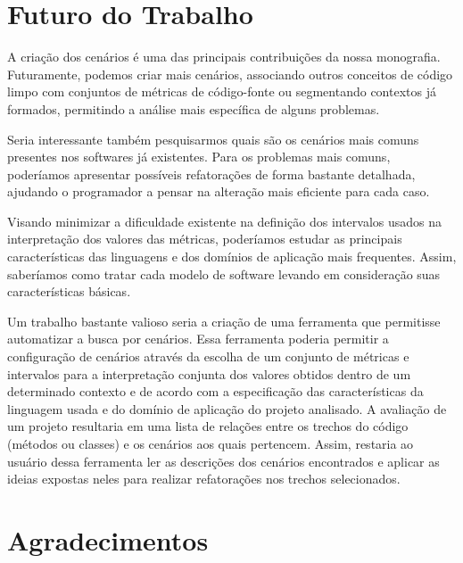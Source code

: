 \documentclass[a4paper, 11pt]{article}
\begin{document}
\section{Futuro do Trabalho}   
                                 
A criação dos cenários é uma das principais contribuições da nossa monografia. Futuramente, podemos criar mais cenários, associando outros conceitos de código limpo com conjuntos de métricas de código-fonte ou segmentando contextos já formados, permitindo a análise mais específica de alguns problemas.                                       

Seria interessante também pesquisarmos quais são os cenários mais comuns presentes nos softwares já existentes. Para os problemas mais comuns, poderíamos apresentar possíveis refatorações de forma bastante detalhada, ajudando o programador a pensar na alteração mais eficiente para cada caso.

Visando minimizar a dificuldade existente na definição dos intervalos usados na interpretação dos valores das métricas, poderíamos estudar as principais características das linguagens e dos domínios de aplicação mais frequentes. Assim, saberíamos como tratar cada modelo de software levando em consideração suas características básicas.

Um trabalho bastante valioso seria a criação de uma ferramenta que permitisse automatizar a busca por cenários. Essa ferramenta poderia permitir a configuração de cenários através da escolha de um conjunto de métricas e intervalos para a interpretação conjunta dos valores obtidos dentro de um determinado contexto e de acordo com a especificação das características da linguagem usada e do domínio de aplicação do projeto analisado. A avaliação de um projeto resultaria em uma lista de relações entre os trechos do código (métodos ou classes) e os cenários aos quais pertencem. Assim, restaria ao usuário dessa ferramenta ler as descrições dos cenários encontrados e aplicar as ideias expostas neles para realizar refatorações nos trechos selecionados.
                          
                                                                                                                                         


\section{Agradecimentos}   
                           
\end{document}
